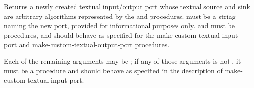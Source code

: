 \begin{entry}{%
}

Returns a newly created textual input/output port whose
textual source and sink are
arbitrary algorithms represented by the  and 
procedures.
 must be a string naming the new port,
provided for informational purposes only.
 and  must be procedures,
and should behave as specified for the
{\cf make-custom-textual-input-port} and
{\cf make-custom-textual-output-port} procedures.

Each of the remaining arguments may be \schfalse{}; if any of
those arguments is not \schfalse{}, it must be a procedure and
should behave as specified in the description of
{\cf make-custom-textual-input-port}.
\end{entry}


